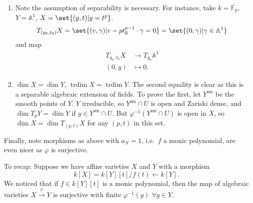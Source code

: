 \documentclass{article}
\newcommand{\A}{\mathbb{A}}
\DeclareMathOperator{\trdim}{trdim}
\begin{document}
\begin{remark}\leavevmode
    \begin{enumerate}[label=(\arabic*)]
        \item Note the assumption of separability is necessary. For instance, take $k = \overline{\mathbb{F}_p}$, $Y = \A^1$, $X = \set{(y, t) | y = t^p}$.
            \begin{equation*}
                T_{(y_0, t_0)} X = \set{(v, \gamma) | v - p t_0^{p-1} \cdot \gamma = 0} = \set{(0, \gamma) | \gamma \in \A^1}
            \end{equation*}
            and map
            \begin{align*}
                T_{y_0,t_0} X &\longrightarrow T_{y_0} \A^1 \\
                (0,y) &\longmapsto 0.
            \end{align*}
        \item $\dim X = \dim Y$, $\trdim X = \trdim Y$. The second equality is clear as this is a separable algebraic extension of fields.
            To prove the first, let $Y^{\text{sm}}$ be the smooth points of $Y$.
            $Y$ irreducible, so $Y^{\text{sm}} \cap U$ is open and Zariski dense, and $\dim T_p Y = \dim Y$ if $y \in Y^{\text{sm}} \cap U$.
            But $\varphi^{-1} (Y^{\text{sm}} \cap U)$ is open in $X$, so $\dim X = \dim T_{(p, t)} X$ for any $(p, t)$ in this set.
    \end{enumerate}
\end{remark}

Finally, note morphisms as above with $a_N = 1$, i.e.\ $f$ a monic polynomial, are even nicer as $\varphi$ is surjective.

To recap:
Suppose we have affine varieties $X$ and $Y$ with a morphism \begin{equation*}k[X] = k[Y][t]/f(t) \leftarrow k[Y].\end{equation*}
We noticed that if $f \in k[Y][t]$ is a monic polynomial, then the map of algebraic varieties $X \xrightarrow{\varphi} Y$ is surjective with finite $\varphi^{-1}(y)$ $\forall y \in Y$.
\end{document}
